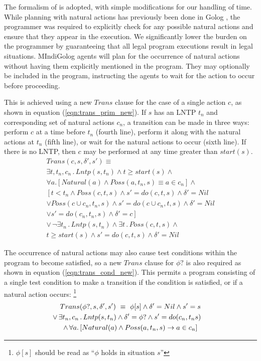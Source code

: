 \documentclass[times, 10pt, twocolumn]{article}
\begin{document}
The formalism of \cite{reiter96sc_nat_conc} is adopted, with simple
modifications for our handling of time. While planning with natural
actions has previously been done in Golog \cite{pirri00planning_nat_acts},
the programmer was required to explicitly check for any possible natural
actions and ensure that they appear in the execution. We significantly
lower the burden on the programmer by guaranteeing that all legal
program executions result in legal situations. MIndiGolog agents will
plan for the occurrence of natural actions without having them explicitly
mentioned in the program. They may optionally be included in the program,
instructing the agents to wait for the action to occur before proceeding.

This is achieved using a new $Trans$ clause for the case of a single
action $c$, as shown in equation (\ref{eqn:trans_prim_new}). If
$s$ has an LNTP $t_{n}$ and corresponding set of natural actions
$c_{n}$, a transition can be made in three ways: perform $c$ at
a time before $t_{n}$ (fourth line), perform it along with the natural
actions at $t_{n}$ (fifth line), or wait for the natural actions
to occur (sixth line). If there is no LNTP, then $c$ may be performed
at any time greater than $start(s)$.
\begin{multline}
Trans(c,s,\delta',s')\equiv\\
\exists t,t_{n},c_{n}\,.\, Lntp(s,t_{n})\wedge t\geq start(s)\wedge\\
\forall a.\left[Natural(a)\wedge Poss(a,t_{n},s)\equiv a\in c_{n}\right]\wedge\\
\left[t<t_{n}\wedge Poss(c,t,s)\wedge s'=do(c,t,s)\wedge\delta'=Nil\right.\\
\vee Poss(c\cup c_{n},t_{n},s)\wedge s'=do(c\cup c_{n},t,s)\wedge\delta'=Nil\\
\vee\left.s'=do(c_{n},t_{n},s)\wedge\delta'=c\right]\\
\vee\,\neg\exists t_{n}\,.\, Lntp(s,t_{n})\wedge\exists t\,.\, Poss(c,t,s)\wedge\\
t\geq start(s)\wedge s'=do(c,t,s)\wedge\delta'=Nil\label{eqn:trans_prim_new}\end{multline}

The occurrence of natural actions may also cause test conditions within
the program to become satisfied, so a new $Trans$ clause for $\phi?$
is also required as shown in equation (\ref{eqn:trans_cond_new}).
This permits a program consisting of a single test condition to make
a transition if the condition is satisfied, or if a natural action
occurs: \footnote{$\phi[s]$ should be read as {}``$\phi$ holds in situation $s$''}
\begin{multline}
Trans(\phi?,s,\delta',s')\,\,\equiv\,\,\phi[s]\wedge\delta'=Nil\wedge s'=s\\
\shoveright{\vee\,\exists t_{n},c_{n}\,.\, Lntp(s,t_{n})\wedge\delta'=\phi?\wedge s'=do(c_{n},t_{n}s)}\\
\wedge\,\forall a.\left[Natural(a)\wedge Poss(a,t_{n},s)\rightarrow a\in c_{n}\right]\label{eqn:trans_cond_new}
\end{multline}
\end{document}
